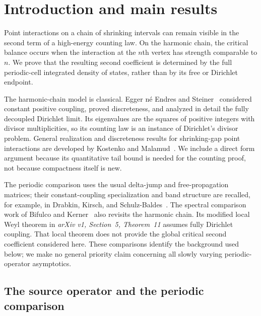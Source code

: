 \section{Introduction and main results}
\label{sec:introduction}

Point interactions on a chain of shrinking intervals can remain visible
in the second term of a high-energy counting law. On the harmonic chain,
the critical balance occurs when the interaction at the $n$th vertex
has strength comparable to $n$. We prove that the resulting second
coefficient is determined by the full periodic-cell integrated density
of states, rather than by its free or Dirichlet endpoint.

The harmonic-chain model is classical. Egger n\'e Endres and
Steiner~\cite{egger2011trace} considered constant positive coupling,
proved discreteness, and analyzed in detail the fully decoupled
Dirichlet limit. Its eigenvalues are the squares of positive integers
with divisor multiplicities, so its counting law is an instance of
Dirichlet's divisor problem. General realization and discreteness
results for shrinking-gap point interactions are developed by Kostenko
and Malamud~\cite{kostenko2010point}. We include a direct form argument
because its quantitative tail bound is needed for the counting proof,
not because compactness itself is new.

The periodic comparison uses the usual delta-jump and free-propagation
matrices; their constant-coupling specialization and band structure
are recalled, for example, in Drabkin, Kirsch, and
Schulz-Baldes~\cite[Secs.~2.1--2.3]{drabkin2012transport}. The spectral
comparison work of Bifulco and Kerner~\cite{bifulco2024comparison}
also revisits the harmonic chain. Its modified local Weyl theorem
in \emph{arXiv v1, Section~5, Theorem~11} assumes fully Dirichlet
coupling. That local theorem does not provide the global critical
second coefficient considered here. These comparisons identify the
background used below; we make no general priority claim concerning
all slowly varying periodic-operator asymptotics.

\subsection{The source operator and the periodic comparison}

